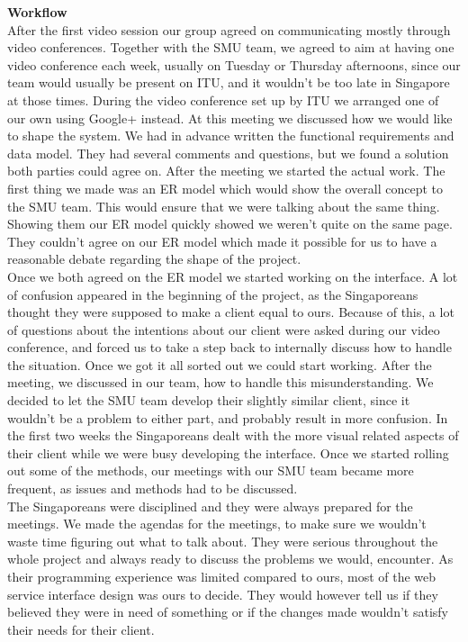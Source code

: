 \documentclass[10pt,a4paper]{article}
\begin{document}
{\bfseries Workflow}\\
After the first video session our group agreed on communicating mostly through video conferences. Together with the SMU team, we agreed to aim at having one video conference each week, usually on Tuesday or Thursday afternoons, since our team would usually be present on ITU, and it wouldn’t be too late in Singapore at those times.
During the video conference set up by ITU we arranged one of our own using Google+ instead. At this meeting we discussed how we would like to shape the system. We had in advance written the functional requirements and data model. They had several comments and questions, but we found a solution both parties could agree on. After the meeting we started the actual work. The first thing we made was an ER model which would show the overall concept to the SMU team. This would ensure that we were talking about the same thing. Showing them our ER model quickly showed we weren’t quite on the same page. They couldn’t agree on our ER model which made it possible for us to have a reasonable debate regarding the shape of the project.\\
Once we both agreed on the ER model we started working on the interface. A lot of confusion appeared in the beginning of the project, as the Singaporeans thought they were supposed to make a client equal to ours. Because of this, a lot of questions about the intentions about our client  were asked during our video conference, and forced us to take a step back to internally discuss how to handle the situation. Once we got it all sorted out we could start working. After the meeting, we discussed in our team, how to handle this misunderstanding. We decided to let the SMU team develop their slightly similar client, since it wouldn’t be a problem to either part, and probably result in more confusion. In the first two weeks the Singaporeans dealt with the more visual related aspects of their client while we were busy developing the interface. Once we started rolling out some of the methods, our meetings with our SMU team became more frequent, as issues and methods had to be discussed.\\
The Singaporeans were disciplined and they were always prepared for the meetings. We made the agendas for the meetings, to make sure we wouldn’t waste time figuring out what to talk about. They were serious throughout the whole project and always ready to discuss the problems we would, encounter. As their programming experience was limited compared to ours, most of the web service interface design was ours to decide. They would however tell us if they believed they were in need of something or if the changes made wouldn't satisfy their needs for their client.\\\\
\end{document}
